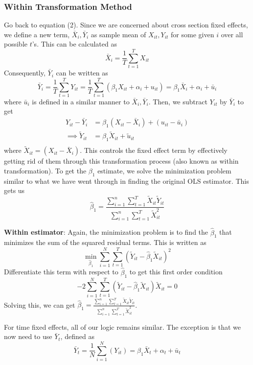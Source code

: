 \documentclass[12pt]{article}
\theoremstyle{definition}
\theoremstyle{property}
\theoremstyle{assumption}
\theoremstyle{example}
\theoremstyle{comment}
\begin{document}
\subsubsection{Within Transformation Method}
Go back to equation (2). Since we are concerned about cross section fixed effects, we define a new term, $\bar{X}_i, \bar{Y}_i$ as sample mean of $X_{it}, Y_{it}$ for some given $i$ over all possible $t$'s. This can be calculated as
\[
\bar{X}_i = \frac{1}{T}\sum_{t=1}^TX_{it}
\]
Consequently, $\bar{Y}_i$ can be written as
\[
\bar{Y}_i = \frac{1}{T}\sum_{t=1}^TY_{it}=\frac{1}{T}\sum_{t=1}^T\left(\beta_1 X_{it} +\alpha_i +u_{it}\right)=\beta_1 \bar{X}_i +\alpha_i + \bar{u}_{i}
\]
where $\bar{u}_i$ is defined in a similar manner to $\bar{X}_i, \bar{Y}_i$. Then, we subtract $Y_{it}$ by $\bar{Y}_i$ to get
\[
\begin{aligned}
Y_{it}-\bar{Y}_i &= \beta_1(X_{it}-\bar{X}_i) + (u_{it}-\bar{u}_i)\\
\implies \tilde{Y}_{it}&= \beta_1 \tilde{X}_{it}+\tilde{u}_{it}\\
\end{aligned}
\]
where $\tilde{X}_{it}= (X_{it}-\bar{X}_i)$. This controls the fixed effect term by effectively getting rid of them through this transformation process (also known as within transformation). To get the $\beta_1$ estimate, we solve the minimization problem similar to what we have went through in finding the original OLS estimator. This gets us
\[
\hat{\beta}_1= \frac{\sum_{i=1}^n \sum_{t=1}^T \tilde{X}_{it}\tilde{Y}_{it}}{\sum_{i=1}^n \sum_{t=1}^T \tilde{X}_{it}^2}
\]
\begin{mdframed}[backgroundcolor =blue!10]
\textbf{Within estimator}: Again, the minimization problem is to find the $\hat{\beta}_1$ that minimizes the sum of the squared residual terms. This is written as
\[
\min_{\hat{\beta}_1} \sum_{i=1}^N \sum_{t=1}^T (\tilde{Y}_{it}-\hat{\beta}_1 \tilde{X}_{it})^2
\]
Differentiate this term with respect to $\hat{\beta}_1$ to get this first order condition
\[
-2\sum_{i=1}^N \sum_{t=1}^T (\tilde{Y}_{it}-\hat{\beta}_1 \tilde{X}_{it})\tilde{X}_{it}=0
\]
Solving this, we can get $\hat{\beta}_1= \frac{\sum_{i=1}^n \sum_{t=1}^T \tilde{X}_{it}\tilde{Y}_{it}}{\sum_{i=1}^n \sum_{t=1}^T \tilde{X}_{it}^2}$. 
\end{mdframed} \par\medskip
For time fixed effects, all of our logic remains similar. The exception is that we now need to use $\bar{Y}_t$, defined as
\[
\bar{Y}_t = \frac{1}{N}\sum_{i=1}^N(Y_{it}) = \beta_1 \bar{X}_t +\alpha_t +\bar{u}_t
\]
\end{document}
